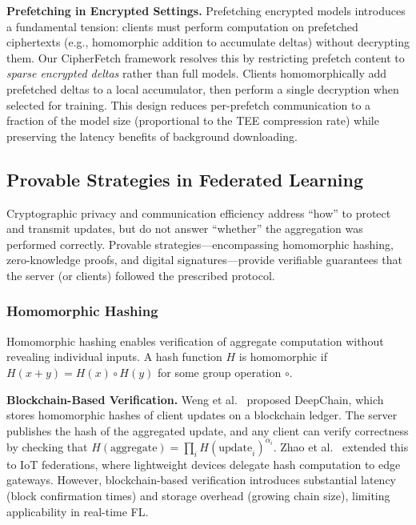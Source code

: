 \textbf{Prefetching in Encrypted Settings.} Prefetching encrypted models introduces a fundamental tension: clients must perform computation on prefetched ciphertexts (e.g., homomorphic addition to accumulate deltas) without decrypting them. Our CipherFetch framework resolves this by restricting prefetch content to \textit{sparse encrypted deltas} rather than full models. Clients homomorphically add prefetched deltas to a local accumulator, then perform a single decryption when selected for training. This design reduces per-prefetch communication to a fraction of the model size (proportional to the TEE compression rate) while preserving the latency benefits of background downloading.

\subsection{Provable Strategies in Federated Learning}
\label{subsec:provable}

Cryptographic privacy and communication efficiency address ``how'' to protect and transmit updates, but do not answer ``whether'' the aggregation was performed correctly. Provable strategies---encompassing homomorphic hashing, zero-knowledge proofs, and digital signatures---provide verifiable guarantees that the server (or clients) followed the prescribed protocol.

\subsubsection{Homomorphic Hashing}
\label{subsubsec:homomorphic-hash}

Homomorphic hashing enables verification of aggregate computation without revealing individual inputs. A hash function $H$ is homomorphic if $H(x + y) = H(x) \circ H(y)$ for some group operation $\circ$.

\textbf{Blockchain-Based Verification.} Weng et al.~\cite{weng2021deepchain} proposed DeepChain, which stores homomorphic hashes of client updates on a blockchain ledger. The server publishes the hash of the aggregated update, and any client can verify correctness by checking that $H(\text{aggregate}) = \prod_i H(\text{update}_i)^{\alpha_i}$. Zhao et al.~\cite{zhao2019privacy} extended this to IoT federations, where lightweight devices delegate hash computation to edge gateways. However, blockchain-based verification introduces substantial latency (block confirmation times) and storage overhead (growing chain size), limiting applicability in real-time FL.

